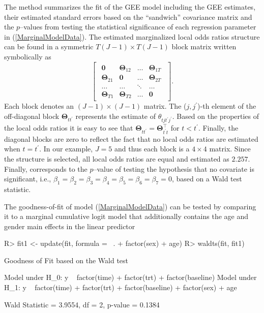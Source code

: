 \documentclass[
]{jss}
\begin{document}
The  method summarizes the fit of the GEE model including
the GEE estimates, their estimated standard errors based on the
``sandwich'' covariance matrix and the \(p\)--values from testing the
statistical significance of each regression parameter in
(\ref{MarginalModelData}). The estimated marginalized local odds ratios
structure can be found in a symmetric \(T(J-1) \times T(J-1)\) block
matrix written symbolically as \[\begin{bmatrix}
\begin{array}{cccc}
\mathbf 0                               &\boldsymbol{\Theta}_{12}                 &\ldots  &\boldsymbol{\Theta}_{1T} \\
\boldsymbol{\Theta}_{21}       &\mathbf 0                                &\ldots  &\boldsymbol{\Theta}_{2T} \\
\ldots                                  &\ldots                                   &\ddots  & \ldots          \\
\boldsymbol{\Theta}_{T1}       &\boldsymbol{\Theta}_{T2}        &\ldots  &\mathbf 0
\end{array}
\end{bmatrix}.\] Each block denotes an \((J-1) \times (J-1)\) matrix.
The (\(j,j^{\prime}\))-th element of the off-diagonal block
\(\boldsymbol{\Theta}_{tt^{\prime}}\) represents the estimate of
\(\theta_{tjt^{\prime}j^{\prime}}\). Based on the properties of the
local odds ratios it is easy to see that
\(\boldsymbol{\Theta}_{tt^{\prime}}=\boldsymbol{\Theta}^{\top}_{t^{\prime}t}\)
for \(t<t^{\prime}\). Finally, the diagonal blocks are zero to reflect
the fact that no local odds ratios are estimated when \(t=t^{\prime}\).
In our example, \(J=5\) and thus each block is a \(4 \times 4\) matrix.
Since the  structure is selected, all local odds ratios
are equal and estimated as \(2.257\). Finally,
 corresponds to the \(p\)--value of testing
the hypothesis that no covariate is significant, i.e.,
\(\beta_1=\beta_2=\beta_3=\beta_4 =\beta_5=\beta_6=\beta_7=0\), based on
a Wald test statistic.

The goodness-of-fit of model (\ref{MarginalModelData}) can be tested by
comparing it to a marginal cumulative logit model that additionally
contains the age and gender main effects in the linear predictor

\begin{CodeChunk}
\begin{CodeInput}
R> fit1 <- update(fit, formula = ~. + factor(sex) + age)
R> waldts(fit, fit1)
\end{CodeInput}
\begin{CodeOutput}
Goodness of Fit based on the Wald test 

Model under H_0: y ~ factor(time) + factor(trt) + factor(baseline)
Model under H_1: y ~ factor(time) + factor(trt) + factor(baseline) + factor(sex) + 
    age

Wald Statistic = 3.9554, df = 2, p-value = 0.1384
\end{CodeOutput}
\end{CodeChunk}
\end{document}
